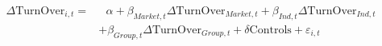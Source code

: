 \begin{equation*}
	\begin{split}
		\Delta \text{TurnOver}_{i,t} =  & \text{	}\alpha + \beta_{Market,t} \Delta \text{TurnOver}_{Market,t}  
		+ \beta_{Ind,t} \Delta \text{TurnOver}_{Ind,t} \\ & + \beta_{Group,t} \Delta \text{TurnOver}_{Group,t} + \delta\text{Controls} + \varepsilon_{i,t}
	\end{split}
\end{equation*}